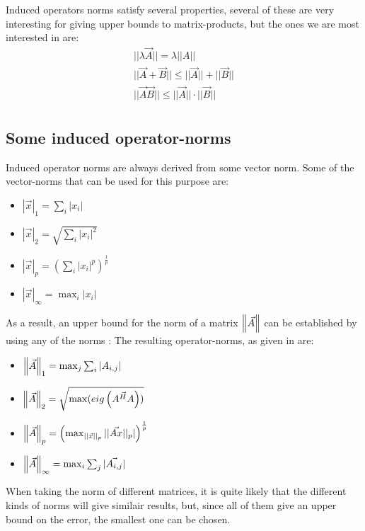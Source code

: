 Induced operators norms satisfy several properties, several of these are very interesting for giving upper bounds to matrix-products, but the ones we are most interested in are: 
\begin{align}
    ||\lambda \Vec{A}|| = \lambda||A||\\
    ||\Vec{A}+\Vec{B}||\leq ||\Vec{A}|| +||\Vec{B}||\\
   ||\Vec{A}\Vec{B}||  \leq ||\Vec{A}|| \cdot ||\Vec{B}||\\
   \label{eq:operator_norm_properties}
\end{align}


\subsection{Some induced operator-norms}
Induced operator norms are always derived from some vector norm. Some of the vector-norms that can be used for this purpose are: 
\begin{itemize}
    \item $|\Vec{x}|_1 = \sum_i |x_i|$
    \item $|\Vec{x}|_2 = \sqrt{ \sum_i |x_i|^2 }$
    \item $|\Vec{x}|_p = \left( \sum_i |x_i|^p\right)^{\frac{1}{p}}$
    \item $|\Vec{x}|_{\infty} = \max_i |x_i|$
    \label{}
\end{itemize}




As a result, an upper bound for the norm of a matrix $\left\lVert\Vec{ A}\right\rVert$ can be established by using any of the norms \cite{Matrix_cookbook}:
The resulting operator-norms, as given in \cite{Matrix_cookbook} are: 
\begin{itemize}
    \item $\left\lVert\Vec{A}\right\rVert_1 = \max_j \sum_i |A_{i,j}|$
    \item $\left\lVert\Vec{A}\right\rVert_2 = \sqrt{\max(eig\left(\Vec{A^H A}\right))}$
    \item $\left\lVert\Vec{A}\right\rVert_p = \left(\max_{||\Vec{x}||_p} ||\Vec{Ax}||_p|\right)^{\frac{1}{p}}$
    \item $\left\lVert\Vec{A}\right\rVert_{\infty} = \max_i \sum_j | \Vec{A_{i,j}}|$
\end{itemize}


When taking the norm of different matrices, it is quite likely that the different kinds of norms will give similair results, but, since all of them give an upper bound on the error, the smallest one can be chosen. 


